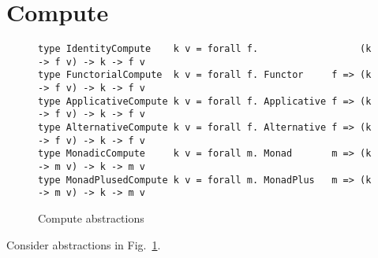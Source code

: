 \section{Compute}\label{sec-compute}

\begin{figure}
\begin{verbatim}
type IdentityCompute    k v = forall f.                  (k -> f v) -> k -> f v
type FunctorialCompute  k v = forall f. Functor     f => (k -> f v) -> k -> f v
type ApplicativeCompute k v = forall f. Applicative f => (k -> f v) -> k -> f v
type AlternativeCompute k v = forall f. Alternative f => (k -> f v) -> k -> f v
type MonadicCompute     k v = forall m. Monad       m => (k -> m v) -> k -> m v
type MonadPlusedCompute k v = forall m. MonadPlus   m => (k -> m v) -> k -> m v
\end{verbatim}
\caption{Compute abstractions}\label{fig-compute}
\end{figure}

Consider abstractions in Fig.~\ref{fig-compute}.

